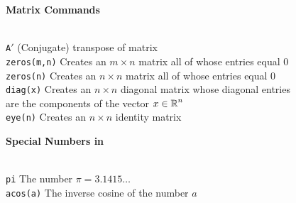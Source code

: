 \documentclass{ximera}
\begin{document}
{\centerline{
{\bf Matrix Commands}
} \vspace*{-0.1in}
 
\begin{tabbing}
 \hspace{1.1in} \= \\
{\tt A$'$}\> (Conjugate) transpose of matrix\\ 
{\tt zeros(m,n)} \> 
Creates an $m\times n$ matrix all of whose entries equal $0$  \\ 
{\tt zeros(n)} \> Creates an $n\times n$ matrix all of whose entries equal $0$\\
{\tt diag(x)} \> Creates an 
$n\times n$ diagonal matrix whose diagonal entries
\\ \> are the components of the vector $x\in\mbox{$\Bbb{R}$}^n$\\
{\tt eye(n)}\>  Creates an $n\times n$ identity matrix 
\end{tabbing}



\centerline{
{\bf Special Numbers in \Matlab}
} \vspace*{-0.1in}

\begin{tabbing}
 \hspace{1.1in} \= \\
 {\tt pi} \> The number $\pi=3.1415\ldots$ \\ 
{\tt acos(a)} \>
  The inverse cosine of the number $a$  
\end{tabbing}

}
\end{document}
